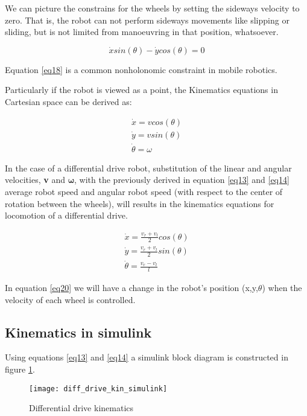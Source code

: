 We can picture the constrains for the wheels by setting the sideways velocity to zero. That is, the robot can not perform sideways movements like slipping or sliding, but is not limited from manoeuvring in that position, whatsoever. 

\begin{equation} \label{eq18}
\dot{x}sin(\theta) - \dot{y}cos(\theta) = 0
\end{equation}

Equation \ref{eq18} is a common nonholonomic constraint in mobile robotics.\cite{NonHB}

Particularly if the robot is viewed as a point, the Kinematics equations in Cartesian space can be derived as:

\begin{align}
\dot{x} = vcos(\theta) \nonumber \\
\dot{y} = vsin(\theta) \label{eq19} \\
\dot{\theta} = \omega  \nonumber 
\end{align}

In the case of a differential drive robot, substitution of the linear and angular velocities, \textbf{v} and $\boldsymbol{\omega}$, with the previously derived in equation \ref{eq13} and \ref{eq14} average robot speed and angular robot speed (with respect to the center of rotation between the wheels), will results in the kinematics equations for locomotion of a differential drive. 

\begin{align}
\dot{x} = \frac{v_r + v_l}{2}cos(\theta) \nonumber \\
\dot{y} = \frac{v_r + v_l}{2}sin(\theta) \label{eq20} \\
\dot{\theta} = \frac{v_r - v_l}{l} \nonumber
\end{align}

In equation \ref{eq20} we will have a change in the robot's position (x,y,$\theta$) when the velocity of each wheel is controlled. 

\subsection{Kinematics in simulink} 

Using equations \ref{eq13} and \ref{eq14} a simulink block diagram is constructed in figure \ref{fig::diff_simulink}.

\begin{figure}[h]
\centering
\texttt{[image: diff\_drive\_kin\_simulink]}
\caption{Differential drive kinematics}
\label{fig::diff_simulink}
\end{figure} 

